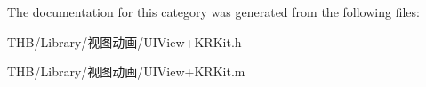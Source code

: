 The documentation for this category was generated from the following files\+:\begin{DoxyCompactItemize}
\item 
T\+H\+B/\+Library/视图动画/U\+I\+View+\+K\+R\+Kit.\+h\item 
T\+H\+B/\+Library/视图动画/U\+I\+View+\+K\+R\+Kit.\+m\end{DoxyCompactItemize}
